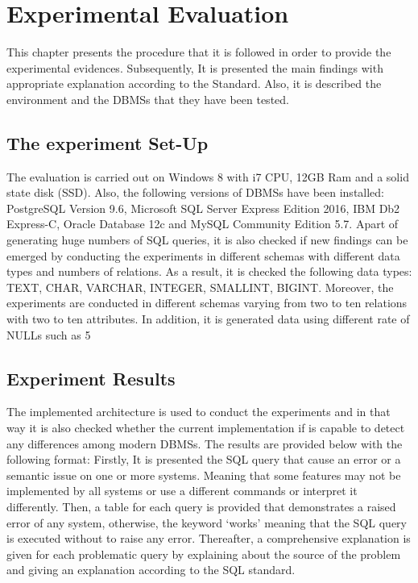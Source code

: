 \chapter{Experimental Evaluation}
This chapter presents the procedure that it is followed in order to provide the experimental evidences. Subsequently, It is presented the main findings with appropriate explanation according to the Standard. Also, it is described  the environment and the DBMSs that they have been tested. 

\section{The experiment Set-Up}
The evaluation is carried out on Windows 8 with i7 CPU, 12GB Ram and a solid state disk (SSD). Also, the  following versions of DBMSs have been installed: PostgreSQL Version 9.6, Microsoft SQL Server Express Edition 2016, IBM Db2 Express-C, Oracle Database 12c and  MySQL Community Edition 5.7. 
Apart of generating huge numbers of SQL queries, it is also checked if new findings can be emerged by conducting the experiments in different schemas with different data types and numbers of relations. As a result, it is checked the following data types:  TEXT, CHAR, VARCHAR, INTEGER, SMALLINT, BIGINT. Moreover, the experiments are conducted in different schemas varying from two to ten relations with two to ten attributes. In addition, it is generated data using different rate of NULLs such as 5%

\section{Experiment Results}
The implemented architecture is used to conduct the experiments and in that way it is also checked whether the current implementation if is capable to detect any differences among modern DBMSs. The results are provided below with the following format: Firstly,  It is presented  the SQL query that cause an error or a semantic issue on one or more systems. Meaning that some features may not be implemented by all systems or use a different commands or interpret it differently.  Then, a table for each query is provided that demonstrates a raised error of any system, otherwise, the keyword ‘works’ meaning that the SQL query is executed without to raise any error. Thereafter, a comprehensive explanation is given for each problematic query by explaining about the source of the problem and giving an explanation according to the SQL standard.   

